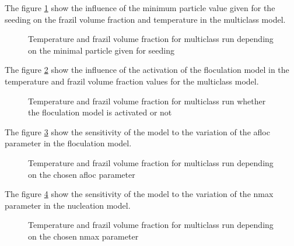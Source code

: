The figure \ref{fig:min_part_fra} show the influence of the minimum particle value given for the seeding on the frazil volume fraction and temperature in the multiclass model.
\begin{figure}[H]
    \begin{center}
    \end{center}
    \caption{Temperature and frazil volume fraction for multiclass run depending on the minimal particle given for seeding}
    \label{fig:min_part_fra}
\end{figure}

The figure \ref{fig:floc_model_fra} show the influence of the activation of the floculation model in the temperature and frazil volume fraction values for the multiclass model.
\begin{figure}[H]
    \begin{center}
    \end{center}
    \caption{Temperature and frazil volume fraction for multiclass run whether the floculation model is activated or not}
    \label{fig:floc_model_fra}
\end{figure}

The figure \ref{fig:floc_alpha_fra} show the sensitivity of the model to the variation of the afloc parameter in the floculation model.
\begin{figure}[H]
    \begin{center}
    \end{center}
    \caption{Temperature and frazil volume fraction for multiclass run depending on the chosen afloc parameter}
    \label{fig:floc_alpha_fra}
\end{figure}

The figure \ref{fig:nmax_fra} show the sensitivity of the model to the variation of the nmax parameter in the nucleation model.
\begin{figure}[H]
    \begin{center}
    \end{center}
    \caption{Temperature and frazil volume fraction for multiclass run depending on the chosen nmax parameter}
    \label{fig:nmax_fra}
\end{figure}

